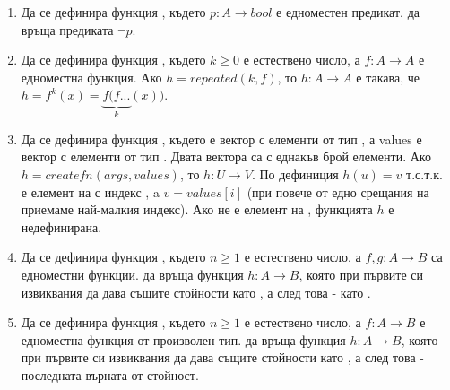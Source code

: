 \begin{enumerate}[resume]

  \item Да се дефинира функция , където $p:A \rightarrow bool$ е едноместен предикат.  да връща предиката $\neg p$.


  \item Да се дефинира функция , където $k \geq 0$ е естествено число, а $f:A \rightarrow A$ е едноместна функция. Ако $h=repeated(k,f)$, то $h:A \rightarrow A$ е такава, че $h=f^k(x)=\underbrace{f(f...}_{k}(x))$.

  \item Да се дефинира функция , където  е вектор с елементи от тип , а values е вектор с елементи от тип . Двата вектора са с еднакъв брой елементи. Ако $h=createfn(args,values)$, то $h:U \rightarrow V$. По дефиниция $h(u)=v$ т.с.т.к.  е елемент на  с индекс , a $v=values[i]$ (при повече от едно срещания на  приемаме най-малкия индекс). Ако  не е елемент на , функцията $h$ е недефинирана.

  \item Да се дефинира функция , където $n \geq 1$ е естествено число, а $f,g:A \rightarrow B$ са едноместни функции.  да връща функция $h:A \rightarrow B$, която при първите си  извиквания да дава същите стойности като , а след това - като .


  \item Да се дефинира функция , където $n \geq 1$ е естествено число, а $f:A \rightarrow B$ е едноместна функция от произволен тип.  да връща функция $h:A \rightarrow B$, която при първите си  извиквания да дава същите стойности като , а след това - последната върната от  стойност.
  
\end{enumerate}
  

